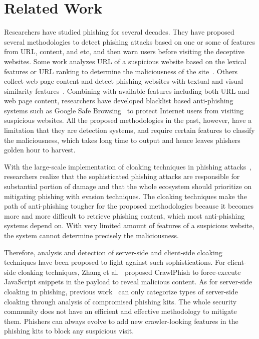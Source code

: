 \section{Related Work}

Researchers have studied phishing for several decades.
They have proposed several methodologies to detect phishing attacks based on one or some of features from URL, content, and etc, and then warn users before visiting the deceptive websites.
Some work analyzes URL of a suspicious website based on the lexical features or URL ranking to determine the maliciousness of the site~\cite{blum2010lexical, le2011phishdef, khonji2012enhancing, feroz2015phishing}.
Others collect web page content and detect phishing websites with textual and visual similarity features~\cite{zhang2007cantina, zhang2011textual, dunlop2010goldphish}.
Combining with available features including both URL and web page content, researchers have developed blacklist based anti-phishing systems such as Google Safe Browsing~\cite{whittaker2010large} to protect Internet users from visiting suspicious websites.
All the proposed methodologies in the past, however, have a limitation that they are detection systems, and require certain features to classify the maliciousness,
which takes long time to output and hence leaves phishers golden hour to harvest.

With the large-scale implementation of cloaking techniques in phishing attacks~\cite{oest2020sunrise, oest2020phishtime, oest2019phishfarm, oest2018inside}, researchers realize that the sophisticated phishing attacks are responsible for substantial portion of damage and that the whole ecosystem should prioritize on mitigating phishing with evasion techniques.
The cloaking techniques make the path of anti-phishing tougher for the proposed methodologies because it becomes more and more difficult to retrieve phishing content, which most anti-phishing systems depend on.
With very limited amount of features of a suspicious website, the system cannot determine precisely the maliciousness.

Therefore, analysis and detection of server-side
and client-side
% 
cloaking techniques have been proposed to fight against such sophistications.
For client-side cloaking techniques, Zhang et al.~\cite{zhang2021crawlphish} proposed CrawlPhish to force-execute JavaScript snippets in the payload to reveal malicious content.
As for server-side cloaking in phishing, previous work~\cite{wang2011cloak, invernizzi2016cloak, oest2018inside} can only categorize types of server-side cloaking through analysis of compromised phishing kits.
The whole security community does not have an efficient and effective methodology to mitigate them.
Phishers can always evolve to add new crawler-looking features in the phishing kits to block any suspicious visit.


